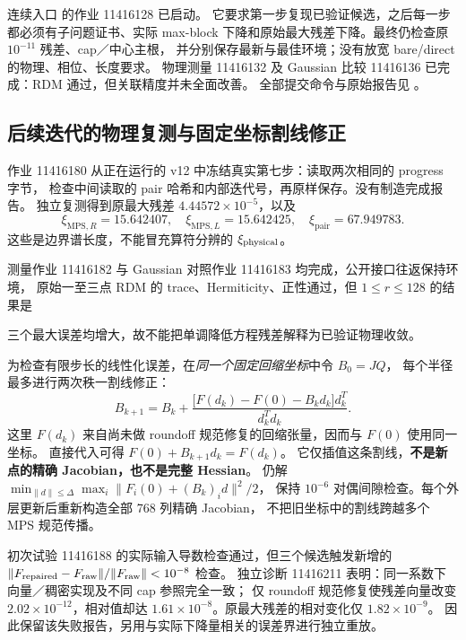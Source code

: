 \documentclass[11pt]{article}
\begin{document}
连续入口  的作业 11416128 已启动。
它要求第一步复现已验证候选，之后每一步都必须有子问题证书、实际 max-block
下降和原始最大残差下降。最终仍检查原 $10^{-11}$ 残差、cap／中心主根，
并分别保存最新与最佳环境；没有放宽 bare/direct 的物理、相位、长度要求。
物理测量 11416132 及 Gaussian 比较 11416136 已完成：RDM 通过，但关联精度并未全面改善。
全部提交命令与原始报告见
。

\subsection{后续迭代的物理复测与固定坐标割线修正}
作业 11416180 从正在运行的 v12 中冻结真实第七步：读取两次相同的 progress 字节，
检查中间读取的 pair 哈希和内部迭代号，再原样保存。没有制造完成报告。
独立复测得到原最大残差 $4.44572\times10^{-5}$，以及
\begin{equation}
 \xi_{\mathrm{MPS},R}=15.642407,\quad
 \xi_{\mathrm{MPS},L}=15.642425,\quad
 \xi_{\mathrm{pair}}=67.949783.
\end{equation}
这些是边界谱长度，不能冒充算符分辨的 $\xi_{\rm physical}$。

测量作业 11416182 与 Gaussian 对照作业 11416183 均完成，公开接口往返保持环境，
原始一至三点 RDM 的 trace、Hermiticity、正性通过，但 $1\leq r\leq128$ 的结果是
\begin{center}\small

\end{center}
三个最大误差均增大，故不能把单调降低方程残差解释为已验证物理收敛。

为检查有限步长的线性化误差，在\emph{同一个固定回缩坐标}中令 $B_0=JQ$，
每个半径最多进行两次秩一割线修正：
\begin{equation}
 B_{k+1}=B_k+
 \frac{\bigl[F(d_k)-F(0)-B_kd_k\bigr]d_k^T}{d_k^Td_k}.
\end{equation}
这里 $F(d_k)$ 来自尚未做 roundoff 规范修复的回缩张量，因而与 $F(0)$ 使用同一坐标。
直接代入可得 $F(0)+B_{k+1}d_k=F(d_k)$。
它仅插值这条割线，\textbf{不是新点的精确 Jacobian，也不是完整 Hessian}。
仍解 $\min_{\|d\|\leq\Delta}\max_i\|F_i(0)+(B_k)_id\|^2/2$，
保持 $10^{-6}$ 对偶间隙检查。每个外层更新后重新构造全部 768 列精确 Jacobian，
不把旧坐标中的割线跨越多个 MPS 规范传播。

初次试验 11416188 的实际输入导数检查通过，但三个候选触发新增的
$\|F_{\rm repaired}-F_{\rm raw}\|/\|F_{\rm raw}\|<10^{-8}$ 检查。
独立诊断 11416211 表明：同一系数下向量／稠密实现及不同 cap 参照完全一致；
仅 roundoff 规范修复使残差向量改变 $2.02\times10^{-12}$，相对值却达
$1.61\times10^{-8}$。原最大残差的相对变化仅 $1.82\times10^{-9}$。
因此保留该失败报告，另用与实际下降量相关的误差界进行独立重放。
\end{document}
